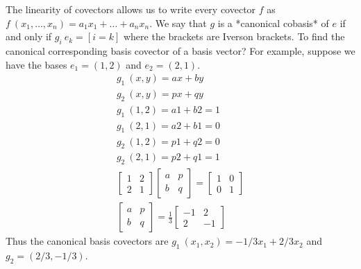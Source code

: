 The linearity of covectors allows us to write every covector $f$
as $f~(x_1,\ldots,x_n) = a_1 x_1 + \ldots + a_n x_n$.
We say that $g$ is a *canonical cobasis* of $e$ if and only if
$g_i~e_k = [i=k]$ where the brackets are
Iverson brackets.
To find the canonical corresponding basis covector of a basis vector?
For example, suppose we have the bases $e_1 = (1,2)$ and $e_2 = (2,1)$.
\begin{align*}
g_1~(x,y) = ax + by
\\ g_2~(x,y) = px + qy
\\ g_1~(1,2) = a1 + b2 = 1
\\ g_1~(2,1) = a2 + b1 = 0
\\ g_2~(1,2) = p1 + q2 = 0
\\ g_2~(2,1) = p2 + q1 = 1
\\
\begin{bmatrix}1 & 2 \\ 2 & 1\end{bmatrix}
\begin{bmatrix}a & p \\ b & q\end{bmatrix}
= \begin{bmatrix}1 & 0 \\ 0 & 1\end{bmatrix}
\\
\begin{bmatrix}a & p \\ b & q\end{bmatrix}
= \frac{1}{3} \begin{bmatrix}-1 & 2 \\ 2 & -1\end{bmatrix}
\end{align*}
Thus the canonical basis covectors are $g_1~(x_1,x_2) = -1/3x_1 + 2/3x_2$ and $g_2 = (2/3,-1/3)$.
